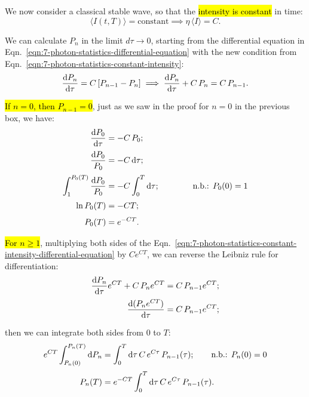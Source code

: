 We now consider a classical stable wave, so that the \hl{intensity is constant} in time:
\begin{equation}\label{eqn:7-photon-statistics-constant-intensity}
\langle I(t,T)\rangle=\text{constant} \implies \eta\,\langle I\rangle = C.
\end{equation}

We can calculate $P_n$ in the limit $d\tau \to 0$, starting from the differential equation in Eqn.~\ref{eqn:7-photon-statistics-differential-equation} with the new condition from Eqn.~\ref{eqn:7-photon-statistics-constant-intensity}:
\begin{equation}\label{eqn:7-photon-statistics-constant-intensity-differential-equation}
\odv{P_n}{\tau}=C\,[P_{n-1}-P_n] \implies \odv{P_n}{\tau}+C\,P_n=C\,P_{n-1}.
\end{equation}

\hl{If $n=0$, then $P_{n-1}=0$}, just as we saw in the proof for $n=0$ in the previous box, we have:
\begin{align}\label{eqn:7-photon-statistics-constant-intensity-n0}
\odv{P_0}{\tau} &= -C\,P_0 ; \\[0.5ex]
\frac{\d P_0}{P_0} &= -C\,\d\tau; \nonumber\\[0.5ex]
\int_{1}^{P_0(T)} \frac{\d P_0}{P_0} &= -C \int_{0}^{T} \d\tau;
\hspace{2em} \tag*{n.b.: $P_0(0)=1$}\\[0.5ex]
\vspace{2ex} \ln{P_0(T)} &= -CT; \nonumber \\[0.75ex]
\vspace{2ex} P_0(T) &= e^{-CT}.
\end{align}

\hl{For $n\geq 1$}, multiplying both sides of the Eqn.~\ref{eqn:7-photon-statistics-constant-intensity-differential-equation} by $Ce^{CT}$, we can reverse the Leibniz rule for differentiation:
\begin{equation}\label{eqn:7-photon-statistics-constant-intensity-recursive-step}
\begin{split}
    \odv{P_n}{\tau} e^{CT} + C\,P_n e^{CT} 
    &= C\,P_{n-1} e^{CT};\\[0.5ex]
    \odv{(P_n e^{CT})}{\tau} 
    &= C\,P_{n-1} e^{CT};
\end{split}
\end{equation}

then we can integrate both sides from $0$ to $T$:
\begin{align}
e^{CT} \int_{P_n(0)}^{P_n(T)} \mathrm{d} P_n &= 
\int_0^T \mathrm{d}\tau\, C\,e^{C\tau}\,P_{n-1}(\tau); 
\tag*{n.b.: $P_n(0)=0$}\\[0.5ex]
P_n(T) &= e^{-CT}\int_0^T \mathrm{d}\tau\, C\,e^{C\tau}\,P_{n-1}(\tau).
\label{eqn:7-photon-statistics-constant-intensity-recursive-step-2}
\end{align}


